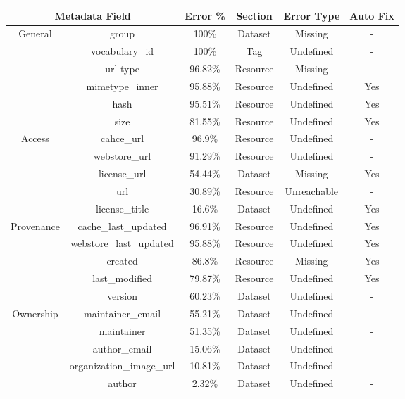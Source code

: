 \documentclass[runningheads,a4paper]{llncs}
\begin{document}
\begin{center}
\begin{tabular}{|c|c|c|c|c|c|}

\hline
\multicolumn{2}{|c|}{Metadata Field} & Error \% & Section & Error Type & Auto Fix\tabularnewline
\hline
\hline
\multirow{6}{*}{General } & group & 100\% & Dataset & Missing & -\tabularnewline
\cline{2-6}
 & vocabulary\_id & 100\% & Tag & Undefined & -\tabularnewline
\cline{2-6}
 & url-type & 96.82\% & Resource & Missing & -\tabularnewline
\cline{2-6}
 & mimetype\_inner & 95.88\% & Resource & Undefined & Yes\tabularnewline
\cline{2-6}
 & hash & 95.51\% & Resource & Undefined & Yes\tabularnewline
\cline{2-6}
 & size & 81.55\% & Resource & Undefined & Yes\tabularnewline
\hline
\multirow{5}{*}{Access } & cahce\_url & 96.9\% & Resource & Undefined & -\tabularnewline
\cline{2-6}
 & webstore\_url & 91.29\% & Resource & Undefined & -\tabularnewline
\cline{2-6}
 & license\_url & 54.44\% & Dataset & Missing & Yes\tabularnewline
\cline{2-6}
 & url & 30.89\% & Resource & Unreachable & -\tabularnewline
\cline{2-6}
 & license\_title & 16.6\% & Dataset & Undefined & Yes\tabularnewline
\hline
\multirow{5}{*}{Provenance } & cache\_last\_updated & 96.91\% & Resource & Undefined & Yes\tabularnewline
\cline{2-6}
 & webstore\_last\_updated & 95.88\% & Resource & Undefined & Yes\tabularnewline
\cline{2-6}
 & created & 86.8\% & Resource & Missing & Yes\tabularnewline
\cline{2-6}
 & last\_modified & 79.87\% & Resource & Undefined & Yes\tabularnewline
\cline{2-6}
 & version & 60.23\% & Dataset & Undefined & -\tabularnewline
\hline
\multirow{5}{*}{Ownership } & maintainer\_email & 55.21\% & Dataset & Undefined & -\tabularnewline
\cline{2-6}
 & maintainer & 51.35\% & Dataset & Undefined & -\tabularnewline
\cline{2-6}
 & author\_email & 15.06\% & Dataset & Undefined & -\tabularnewline
\cline{2-6}
 & organization\_image\_url & 10.81\% & Dataset & Undefined & -\tabularnewline
\cline{2-6}
 & author & 2.32\% & Dataset & Undefined & -\tabularnewline
\hline
\end{tabular}
 \label{tab:main}
\end{center}
\end{document}
